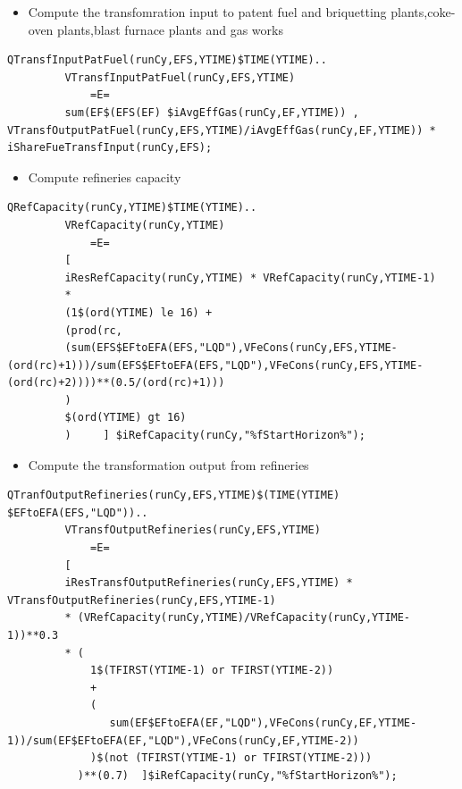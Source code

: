 \documentclass[a4paper,]{scrartcl}
\providecommand{\tightlist}{%
  \setlength{\itemsep}{0pt}\setlength{\parskip}{0pt}}
\begin{document}
\begin{itemize}
\tightlist
\item
  Compute the transfomration input to patent fuel and briquetting
  plants,coke-oven plants,blast furnace plants and gas works
\end{itemize}

\begin{lstlisting}
QTransfInputPatFuel(runCy,EFS,YTIME)$TIME(YTIME)..
         VTransfInputPatFuel(runCy,EFS,YTIME)
             =E=
         sum(EF$(EFS(EF) $iAvgEffGas(runCy,EF,YTIME)) , VTransfOutputPatFuel(runCy,EFS,YTIME)/iAvgEffGas(runCy,EF,YTIME)) * iShareFueTransfInput(runCy,EFS); 
\end{lstlisting}

\begin{itemize}
\tightlist
\item
  Compute refineries capacity
\end{itemize}

\begin{lstlisting}
QRefCapacity(runCy,YTIME)$TIME(YTIME)..
         VRefCapacity(runCy,YTIME)
             =E=
         [
         iResRefCapacity(runCy,YTIME) * VRefCapacity(runCy,YTIME-1)
         *
         (1$(ord(YTIME) le 16) +
         (prod(rc,
         (sum(EFS$EFtoEFA(EFS,"LQD"),VFeCons(runCy,EFS,YTIME-(ord(rc)+1)))/sum(EFS$EFtoEFA(EFS,"LQD"),VFeCons(runCy,EFS,YTIME-(ord(rc)+2))))**(0.5/(ord(rc)+1)))
         )
         $(ord(YTIME) gt 16)
         )     ] $iRefCapacity(runCy,"%fStartHorizon%");
\end{lstlisting}

\begin{itemize}
\tightlist
\item
  Compute the transformation output from refineries
\end{itemize}

\begin{lstlisting}
QTranfOutputRefineries(runCy,EFS,YTIME)$(TIME(YTIME) $EFtoEFA(EFS,"LQD"))..
         VTransfOutputRefineries(runCy,EFS,YTIME)
             =E=
         [
         iResTransfOutputRefineries(runCy,EFS,YTIME) * VTransfOutputRefineries(runCy,EFS,YTIME-1)
         * (VRefCapacity(runCy,YTIME)/VRefCapacity(runCy,YTIME-1))**0.3
         * (
             1$(TFIRST(YTIME-1) or TFIRST(YTIME-2))
             +
             (
                sum(EF$EFtoEFA(EF,"LQD"),VFeCons(runCy,EF,YTIME-1))/sum(EF$EFtoEFA(EF,"LQD"),VFeCons(runCy,EF,YTIME-2))
             )$(not (TFIRST(YTIME-1) or TFIRST(YTIME-2)))
           )**(0.7)  ]$iRefCapacity(runCy,"%fStartHorizon%"); 
\end{lstlisting}
\end{document}
